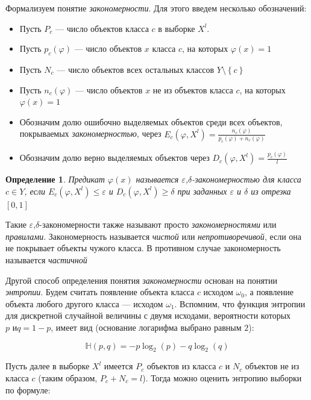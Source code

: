 \documentclass[12pt]{article}
\newtheorem{definition}{Определение}
\begin{document}
Формализуем понятие \emph{закономерности}. Для этого введем несколько
обозначений:

\begin{itemize}
\item Пусть \(P_c\) --- число объектов класса \(c\) в выборке \(X^l\).
\item Пусть \(p_c(\varphi)\) --- число объектов \(x\) класса \(c\), на
  которых \(\varphi(x) = 1\)
\item Пусть \(N_c\) --- число объектов всех остальных классов \(Y
  \setminus \left\{c\right\}\)
\item Пусть \(n_c(\varphi)\) --- число объектов \(x\) не из объектов
  класса \(c\), на которых \(\varphi(x) = 1\)
\item Обозначим долю ошибочно выделяемых объектов среди всех объектов,
  покрываемых \emph{закономерностью}, через \(E_c(\varphi, X^l) =
  \frac{n_c(\varphi)}{p_c(\varphi) + n_c(\varphi)}\)
\item Обозначим долю верно выделяемых объектов через \(D_c(\varphi,
  X^l) = \frac{p_c(\varphi)}{l}\)
\end{itemize}

\begin{definition}
  Предикат \(\varphi(x)\) называется
  \emph{\(\varepsilon\),\(\delta\)-закономерностью} для класса \(c \in
  Y\), если \(E_c(\varphi, X^l) \leq \varepsilon \) и \(D_c(\varphi,
  X^l)\geq\delta\) при заданных \(\varepsilon\) и \(\delta\) из
  отрезка \([0, 1]\)
\end{definition}

Такие \(\varepsilon\),\(\delta\)-закономерности также называют просто
\emph{закономерностями} или \emph{правилами}. Закономерность
называется \emph{чистой} или \emph{непротиворечивой}, если она не
покрывает объекты чужого класса. В противном случае закономерность
называется \emph{частичной}

Другой способ определения понятия \emph{закономерности} основан на
понятии \emph{энтропии}. Будем считать появление объекта класса \(c\)
исходом \(\omega_0\), а появление объекта любого другого класса ---
исходом \(\omega_1\). Вспомним, что функция энтропии для дискретной
случайной величины с двумя исходами, вероятности которых \(p \text{ и
} q = 1 - p\), имеет вид (основание логарифма выбрано равным \(2\)):

\[\mathbb{H}(p, q) = -p\log_2(p)-q\log_2(q)\]

Пусть далее в выборке \(X^l\) имеется \(P_c\) объектов из класса \(c\)
и \(N_c\) объектов не из класса \(c\) (таким образом, \(P_c + N_c =
l\)). Тогда можно оценить энтропию выборки по формуле:
\end{document}
